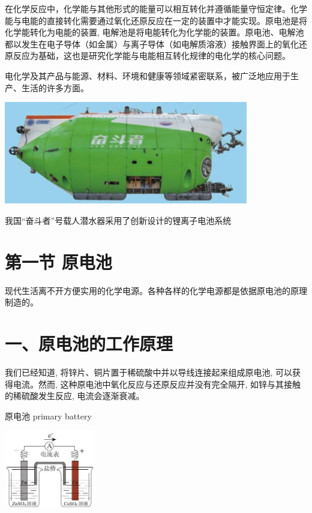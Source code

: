 \documentclass[10pt]{article}
\begin{document}
在化学反应中，化学能与其他形式的能量可以相互转化并遵循能量守恒定律。化学能与电能的直接转化需要通过氧化还原反应在一定的装置中才能实现。原电池是将化学能转化为电能的装置, 电解池是将电能转化为化学能的装置。原电池、电解池都以发生在电子导体（如金属）与离子导体（如电解质溶液）接触界面上的氧化还原反应为基础，这也是研究化学能与电能相互转化规律的电化学的核心问题。

电化学及其产品与能源、材料、环境和健康等领域紧密联系，被广泛地应用于生产、生活的许多方面。

\begin{center}
\includegraphics[max width=0.8\textwidth]{images/0190da9d-8bfd-732f-bc2c-0b21d0f13b91_100_413564.jpg}
\end{center}

我国“奋斗者”号载人潜水器采用了创新设计的锂离子电池系统

\section*{第一节 原电池}

现代生活离不开方便实用的化学电源。各种各样的化学电源都是依据原电池的原理制造的。

\section*{一、原电池的工作原理}

我们已经知道, 将锌片、铜片置于稀硫酸中并以导线连接起来组成原电池, 可以获得电流。然而, 这种原电池中氧化反应与还原反应并没有完全隔开, 如锌与其接触的稀硫酸发生反应, 电流会逐渐衰减。

\begin{mdframed}

原电池 primary battery

\end{mdframed}

\begin{center}
\includegraphics[max width=0.3\textwidth]{images/0190da9d-8bfd-732f-bc2c-0b21d0f13b91_101_891612.jpg}
\end{center}
\end{document}
